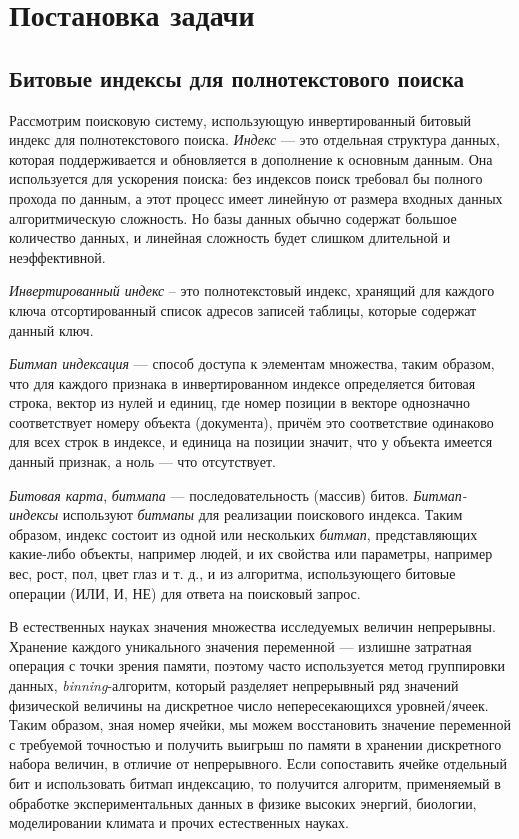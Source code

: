 \newpage
\section{Постановка задачи}

\subsection{Битовые индексы для полнотекстового поиска}

Рассмотрим поисковую систему, использующую инвертированный битовый индекс
для полнотекстового поиска. \textit{Индекс} — это отдельная структура данных,
которая поддерживается и обновляется в дополнение к основным данным.
Она используется для ускорения поиска: без индексов поиск требовал бы полного
прохода по данным, а этот процесс имеет линейную от размера входных данных
алгоритмическую сложность. Но базы данных обычно содержат большое количество
данных, и линейная сложность будет слишком длительной и неэффективной.

\textit{Инвертированный индекс} – это полнотекстовый индекс, хранящий для каждого
ключа отсортированный список адресов записей таблицы, которые содержат данный ключ.

\textit{Битмап индексация} — способ доступа к элементам множества, таким образом,
что для каждого признака в инвертированном индексе определяется битовая
строка, вектор из нулей и единиц, где номер позиции в векторе однозначно
соответствует номеру объекта (документа), причём это соответствие одинаково для
всех строк в индексе, и единица на позиции значит, что у объекта имеется данный 
признак, а ноль — что отсутствует.

\textit{Битовая карта}, \textit{битмапа} — последовательность (массив) битов.
\textit{Битмап-индексы} используют \textit{битмапы} для реализации поискового
индекса. Таким образом, индекс состоит из одной или нескольких \textit{битмап},
представляющих какие-либо объекты, например людей, и их свойства
или параметры, например вес, рост, пол, цвет глаз и т. д., и из алгоритма,
использующего битовые операции (ИЛИ, И, НЕ) для ответа на поисковый запрос.

В естественных науках значения множества исследуемых величин непрерывны. Хранение
каждого уникального значения переменной — излишне затратная операция с точки
зрения памяти, поэтому часто используется метод группировки данных,
\textit{binning}-алгоритм, который разделяет непрерывный ряд значений физической
величины на дискретное число непересекающихся уровней/ячеек. Таким 
образом, зная номер ячейки, мы можем восстановить значение переменной с требуемой
точностью и получить выигрыш по памяти в хранении дискретного набора величин,
в отличие от непрерывного. Если сопоставить ячейке отдельный бит и использовать
битмап индексацию, то получится алгоритм, применяемый в обработке
экспериментальных данных в физике высоких энергий, биологии, моделировании климата
и прочих естественных науках.

